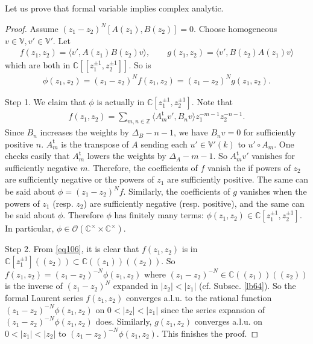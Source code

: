 \documentclass[12pt,a4paper,notitlepage]{article}
\theoremstyle{definition}
\theoremstyle{plain}
\newcommand{\tr}{\mathrm{t}} %
\newcommand{\bk}[1]{\langle {#1}\rangle}
\newcommand{\scr}{\mathscr}
\newcommand{\Vbb}{\mathbb V}
\newcommand{\Cbb}{\mathbb C}
\newcommand{\Zbb}{\mathbb Z}
\numberwithin{equation}{section}
\begin{document}
\subsection{}\label{lb68}

Let us prove that formal variable implies complex analytic.
\begin{proof}
Assume $(z_1-z_2)^N[A(z_1),B(z_2)]=0$. Choose homogeneous $v\in\Vbb,v'\in\Vbb'$. Let
\begin{align*}
	f(z_1,z_2)=	\bk{v',A(z_1)B(z_2)v},\qquad g(z_1,z_2)=\bk{v',B(z_2)A(z_1)v}
\end{align*}
which are both in $\Cbb[[z_1^{\pm1},z_2^{\pm1}]]$. So is
\begin{align*}
	\phi(z_1,z_2)=(z_1-z_2)^Nf(z_1,z_2)=(z_1-z_2)^Ng(z_1,z_2).	
\end{align*}


Step 1. We claim that $\phi$ is actually in $\Cbb[z_1^{\pm1},z_2^{\pm1}]$. Note that
\begin{align}
f(z_1,z_2)=\sum_{m,n\in\Zbb}\bk{A^\tr_mv',B_nv}z_1^{-m-1}z_2^{-n-1}.\label{eq106}
\end{align}
Since $B_n$ increases the weights by $\Delta_B-n-1$, we have $B_nv=0$ for sufficiently positive $n$. $A_m^\tr$ is the transpose of $A$ sending each $u'\in\Vbb'(k)$ to $u'\circ A_m$. One checks easily that $A_m^\tr$ lowers the weights by $\Delta_A-m-1$. So $A_m^\tr v'$ vanishes for sufficiently negative $m$. Therefore, the coefficients of $f$ vanish the if powers of $z_2$ are sufficiently negative or the powers of $z_1$ are sufficiently positive. The same can be said about $\phi=(z_1-z_2)^Nf$. Similarly, the coefficients of $g$ vanishes when the powers of $z_1$ (resp. $z_2$) are sufficiently negative (resp. positive), and the same can be said about $\phi$. Therefore $\phi$ has finitely many terms: $\phi(z_1,z_2)\in\Cbb[z_1^{\pm1},z_2^{\pm1}]$. In particular, $\phi\in\scr O(\Cbb^\times\times\Cbb^\times)$.

Step 2. From \eqref{eq106}, it is clear that $f(z_1,z_2)$ is in $\Cbb[z_1^{\pm1}]((z_2))\subset\Cbb((z_1))((z_2))$. So $f(z_1,z_2)=(z_1-z_2)^{-N}\phi(z_1,z_2)$ where $(z_1-z_2)^{-N}\in\Cbb((z_1))((z_2))$ is the inverse of $(z_1-z_2)^N$ expanded in $|z_2|<|z_1|$ (cf. Subsec. \ref{lb64}). So the formal Laurent series $f(z_1,z_2)$ converges a.l.u. to the rational function $(z_1-z_2)^{-N}\phi(z_1,z_2)$ on $0<|z_2|<|z_1|$ since the series expansion of $(z_1-z_2)^{-N}\phi(z_1,z_2)$ does. Similarly, $g(z_1,z_2)$ converges a.l.u. on $0<|z_1|<|z_2|$ to $(z_1-z_2)^{-N}\phi(z_1,z_2)$. This finishes the proof.
\end{proof}
\end{document}
